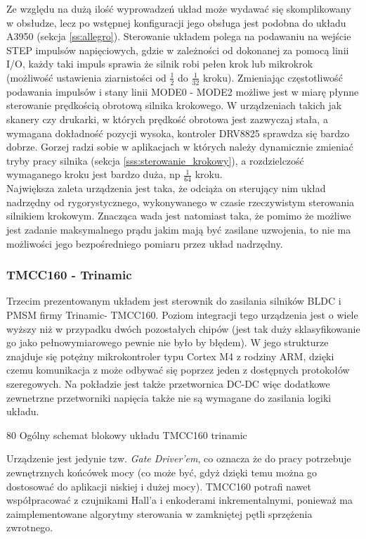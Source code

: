Ze względu na dużą ilość wyprowadzeń układ może wydawać się skomplikowany w obsłudze, lecz po wstępnej konfiguracji jego obsługa jest podobna do układu A3950 (sekcja \ref{ss:allegro}). Sterowanie układem polega na podawaniu na wejście STEP impulsów napięciowych, gdzie w zależności od dokonanej za pomocą linii I/O, każdy taki impuls sprawia że silnik robi pełen krok lub mikrokrok (możliwość ustawienia ziarnistości od $ \frac{1}{2} $ do $ \frac{1}{32} $ kroku). Zmieniając częstotliwość podawania impulsów i stany linii MODE0 - MODE2 możliwe jest w miarę płynne sterowanie prędkością obrotową silnika krokowego. W urządzeniach takich jak skanery czy drukarki, w których prędkość obrotowa jest zazwyczaj stała, a wymagana dokładność pozycji wysoka, kontroler DRV8825 sprawdza się bardzo dobrze. Gorzej radzi sobie w aplikacjach w których należy dynamicznie zmieniać tryby pracy silnika (sekcja \ref{sss:sterowanie_krokowy}), a rozdzielczość wymaganego kroku jest bardzo duża, np $ \frac{1}{64} $ kroku. \\

Największa zaleta urządzenia jest taka, że odciąża on sterujący nim układ nadrzędny od rygorystycznego, wykonywanego w czasie rzeczywistym sterowania silnikiem krokowym. Znacząca wada jest natomiast taka, że pomimo że możliwe jest zadanie maksymalnego prądu jakim mają być zasilane uzwojenia, to nie ma możliwości jego bezpośredniego pomiaru przez układ nadrzędny.

\subsubsection{TMCC160 - Trinamic}

Trzecim prezentowanym układem jest sterownik do zasilania silników BLDC i PMSM firmy Trinamic- TMCC160. Poziom integracji tego urządzenia jest o wiele wyższy niż w przypadku dwóch pozostałych chipów (jest tak duży sklasyfikowanie go jako pełnowymiarowego pewnie nie było by błędem). W jego strukturze znajduje się potężny mikrokontroler typu Cortex M4 z rodziny ARM, dzięki czemu komunikacja z może odbywać się poprzez jeden z dostępnych protokołów szeregowych. Na pokładzie jest także przetwornica DC-DC więc dodatkowe zewnetrzne przetworniki napięcia także nie są wymagane do zasilania logiki układu. 

	{80}
	{Ogólny schemat blokowy układu TMCC160}
	{trinamic}

Urządzenie jest jedynie tzw. {\it Gate Driver'em}, co oznacza że do pracy potrzebuje zewnętrznych końcówek mocy (co może być, gdyż dzięki temu można go dostosować do aplikacji niskiej i dużej mocy). TMCC160 potrafi nawet współpracować z czujnikami Hall'a i enkoderami inkrementalnymi, ponieważ ma zaimplementowane algorytmy sterowania w zamkniętej pętli sprzężenia zwrotnego. \\

